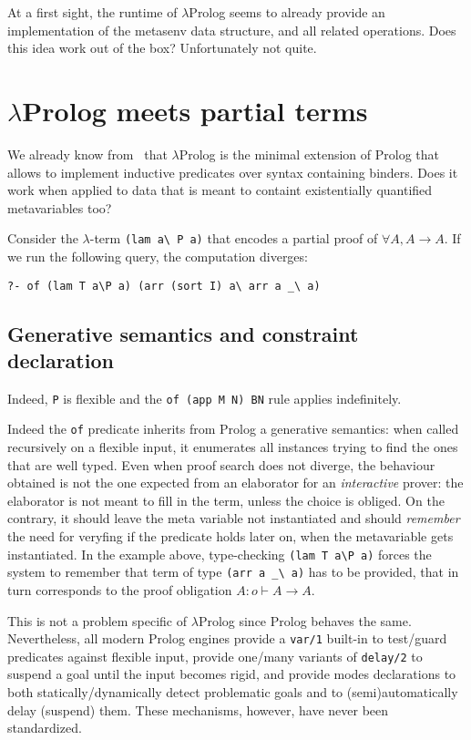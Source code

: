\documentclass{easychair}
\begin{document}
At a first sight, the runtime of $\lambda$Prolog seems to already provide
an implementation of the metasenv data structure, and all related operations.
Does this idea work out of the box? Unfortunately not quite.

\section{$\lambda$Prolog meets partial terms}

We already know from~\cite{jlp98} that $\lambda$Prolog is the minimal
extension of Prolog that allows to implement inductive predicates over
syntax containing binders. Does it work when applied to data that is
meant to containt existentially quantified metavariables too?

Consider the $\lambda$-term \verb+(lam a\ P a)+ that encodes a
partial proof of $\forall A, A \to A$.
If we run the following query, the computation diverges:

\begin{verbatim}
?- of (lam T a\P a) (arr (sort I) a\ arr a _\ a)
\end{verbatim}

\subsection{Generative semantics and constraint declaration} %
\label{sec:delay}

Indeed, \verb+P+ is flexible and the \verb+of (app M N) BN+
rule applies indefinitely.

Indeed the \verb+of+ predicate inherits from Prolog a generative semantics:
when called recursively on a flexible input, it enumerates all
instances trying to find the ones that are well typed. Even when proof
search does not diverge, the behaviour obtained is not the one
expected from an elaborator for an \emph{interactive} prover: the
elaborator is not meant to fill in the term, unless the choice is
obliged. On the contrary, it should leave the meta variable not
instantiated and should \emph{remember} the need for
veryfing if the predicate holds later on, when the metavariable gets
instantiated. In the example above, type-checking \verb+(lam T a\P a)+ forces
the system to remember that term of type \verb+(arr a _\ a)+ has to be
provided, that in turn corresponds to the proof obligation
$A : o \vdash A \to A $.

This is not a problem specific of $\lambda$Prolog since Prolog behaves the same.
Nevertheless, all modern Prolog engines provide a \verb+var/1+ built-in to
test/guard predicates against flexible input, provide one/many variants of
\verb+delay/2+ to suspend a goal until the input becomes rigid, and provide
modes declarations to both statically/dynamically detect problematic goals
and to (semi)automatically delay (suspend) them.
These mechanisms, however, have never been standardized.
\end{document}

